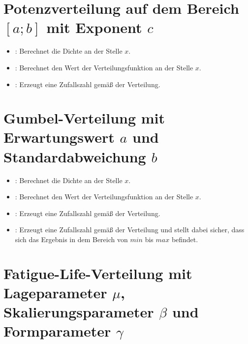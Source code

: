 \section{Potenzverteilung auf dem Bereich \texorpdfstring{$[a;b]$}{[a;b]} mit Exponent \texorpdfstring{$c$}{c}}

\begin{itemize}

\item
{}:
Berechnet die Dichte an der Stelle $x$.

\item
{}:
Berechnet den Wert der Verteilungsfunktion an der Stelle $x$.

\item
{}:
Erzeugt eine Zufallszahl gemäß der Verteilung.

\end{itemize}



\section{Gumbel-Verteilung mit Erwartungswert \texorpdfstring{$a$}{a} und Standardabweichung \texorpdfstring{$b$}{b}}

\begin{itemize}

\item
{}:
Berechnet die Dichte an der Stelle $x$.

\item
{}:
Berechnet den Wert der Verteilungsfunktion an der Stelle $x$.

\item
{}:
Erzeugt eine Zufallszahl gemäß der Verteilung.

\item
{}:
Erzeugt eine Zufallszahl gemäß der Verteilung und stellt dabei sicher, dass sich das Ergebnis in dem Bereich von $min$ bis $max$ befindet.

\end{itemize}



\section{Fatigue-Life-Verteilung mit Lageparameter \texorpdfstring{$\mu$}{mu}, Skalierungsparameter \texorpdfstring{$\beta$}{beta} und Formparameter \texorpdfstring{$\gamma$}{gamma}}

